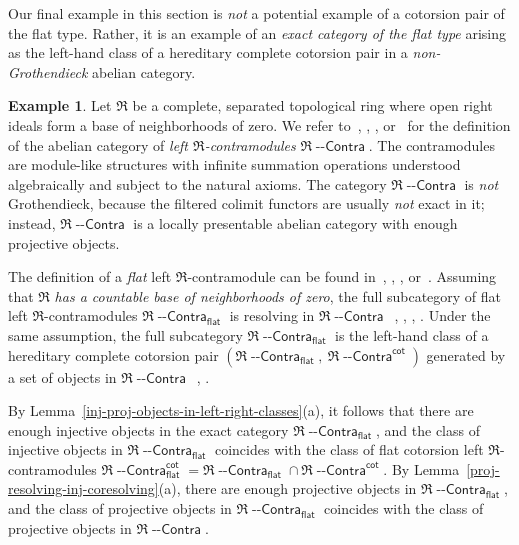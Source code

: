 \documentclass[12pt,a4paper]{amsart}
\newcommand{\+}{\nobreakdash-}
\renewcommand{\:}{\colon}
\newcommand{\Contra}{{\operatorname{\mathsf{--Contra}}}}
\newcommand{\fR}{\mathfrak R}
\renewcommand{\flat}{\mathsf{flat}}
\renewcommand{\cot}{\mathsf{cot}}
\theoremstyle{plain}
\theoremstyle{definition}
\newtheorem{ex}[thm]{Example}
\begin{document}
 Our final example in this section is \emph{not} a potential example
of a cotorsion pair of the flat type.
 Rather, it is an example of an \emph{exact category of the flat type}
arising as the left-hand class of a hereditary complete cotorsion
pair in a \emph{non-Grothendieck} abelian category.

\begin{ex} \label{flat-contramodules-exact-category-flat-type}
 Let $\fR$ be a complete, separated topological ring where open right
ideals form a base of neighborhoods of zero.
 We refer to~\cite[Section~5]{PR}, \cite[Section~2.1]{Prev}, 
\cite[Section~7]{Pflcc}, or~\cite[Section~3]{Pbc} for the definition
of the abelian category of \emph{left\/ $\fR$\+contramodules}
$\fR\Contra$.
 The contramodules are module-like structures with infinite summation
operations understood algebraically and subject to the natural axioms.
 The category $\fR\Contra$ is \emph{not} Grothendieck, because
the filtered colimit functors are usually \emph{not} exact in it;
instead, $\fR\Contra$ is a locally presentable abelian category
with enough projective objects.

 The definition of a \emph{flat} left $\fR$\+contramodule can be
found in~\cite[Section~5]{PR}, \cite[Section~3.3]{Prev},
\cite[Section~8]{Pflcc}, or~\cite[Section~3]{Pbc}.
 Assuming that $\fR$ \emph{has a countable base of neighborhoods of
zero}, the full subcategory of flat left $\fR$\+contramodules
$\fR\Contra_\flat$ is resolving in $\fR\Contra$ \,\cite[Corollary~6.8,
Lemma~6.9, Corollary~6.13, and Corollary~6.15]{PR},
\cite[Proposition~3.10]{Prev}, \cite[Lemma~8.4(a)]{Pflcc},
\cite[Lemma~4.2]{Pbc}.
 Under the same assumption, the full subcategory $\fR\Contra_\flat$
is the left-hand class of a hereditary complete cotorsion pair
$(\fR\Contra_\flat,\allowbreak\>\fR\Contra^\cot)$ generated by a set
of objects in $\fR\Contra$ \,\cite[Corollaries~7.1, 7.6,
and~7.8]{PR}, \cite[Proposition~8.1 and the subsequent
paragraph]{Pbc}.

 By Lemma~\ref{inj-proj-objects-in-left-right-classes}(a), it follows
that there are enough injective objects in the exact category
$\fR\Contra_\flat$, and the class of injective objects in
$\fR\Contra_\flat$ coincides with the class of flat cotorsion
left $\fR$\+contramodules $\fR\Contra_\flat^\cot=\fR\Contra_\flat
\cap\fR\Contra^\cot$.
 By Lemma~\ref{proj-resolving-inj-coresolving}(a), there are enough
projective objects in $\fR\Contra_\flat$, and the class of projective
objects in $\fR\Contra_\flat$ coincides with the class of projective
objects in $\fR\Contra$.


\end{ex}
\end{document}
